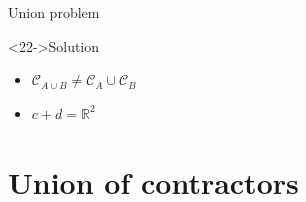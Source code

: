 \documentclass[10pt, xcolor={usenames, dvipsnames}]{beamer}
\begin{document}
\begin{frame}[fragile]{Union problem}
\begin{minipage}[t]{.5\textwidth}
\begin{overprint}
{                }
            \end{overprint}
        \end{minipage}
        \begin{center}
            \begin{minipage}[c]{.5\textwidth}
                \vspace{-5mm}
                \begin{alertblock}<22->{Solution}
                    \vspace{2.5mm}
                    \begin{itemize}
                        \item<23-> $\mathcal{C}_{A\cup B} \neq \mathcal{C}_{A} \cup \mathcal{C}_{B}$
                        \item<24-> $c + d = \mathbb{R}^2$
                    \end{itemize}
                \end{alertblock}
            \end{minipage}
        \end{center}
    \end{frame}

    \section{Union of contractors}
\end{document}
